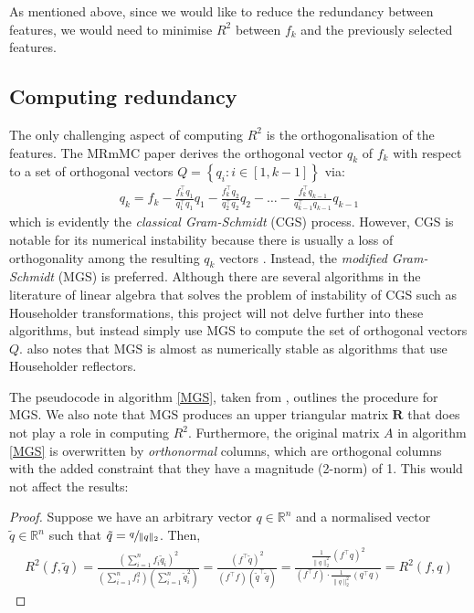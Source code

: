 \documentclass[12pt, twoside, a4paper]{report}
\begin{document}
As mentioned above, since we would like to reduce the redundancy between features, we would need to minimise $R^2$ between $f_k$ and the previously selected features.


\subsection{Computing redundancy}

The only challenging aspect of computing $R^2$ is the orthogonalisation of the features. The MRmMC paper \cite{RefWorks:187} derives the orthogonal vector $q_k$ of $f_k$ with respect to a set of orthogonal vectors $Q = \left\lbrace q_i: i \in [1, k-1] \right\rbrace$ via:
\begin{align*}
q_k = f_k  - \frac{f_k^\top q_1}{q_1^\top q_1}q_1  - \frac{f_k^\top q_2}{q_2^\top q_2}q_2 - \dots - \frac{f_k^\top q_{k-1}}{q_{k-1}^\top q_{k-1}}q_{k-1}
\end{align*}
which is evidently the \textit{classical Gram-Schmidt} (CGS) process. However, CGS is notable for its numerical instability because there is usually a loss of orthogonality among the resulting $q_k$ vectors \cite{RefWorks:195}. Instead, the \textit{modified Gram-Schmidt} (MGS) is preferred. Although there are several algorithms in the literature of linear algebra that solves the problem of instability of CGS such as Householder transformations, this project will not delve further into these algorithms, but instead simply use MGS to compute the set of orthogonal vectors $Q$. \cite{RefWorks:194} also notes that MGS is almost as numerically stable as algorithms that use Householder reflectors.

The pseudocode in algorithm \ref{MGS}, taken from \cite{RefWorks:195}, outlines the procedure for MGS. We also note that MGS produces an upper triangular matrix $\boldsymbol R$ that does not play a role in computing $R^2$. Furthermore, the original matrix $A$ in algorithm \ref{MGS} is overwritten by \textit{orthonormal} columns, which are orthogonal columns with the added constraint that they have a magnitude (2-norm) of 1. This would not affect the results:

\begin{proof}
Suppose we have an arbitrary vector $q \in \mathbb{R}^n$ and a normalised vector $\tilde{q} \in \mathbb{R}^n$ such that $\tilde{q} = \sfrac{q}{\| q \|_2}$. Then,
\begin{align*}
R^2(f, \tilde{q}) = \frac{\left( \sum_{i=1}^n f_i \tilde{q}_i \right)^2}{\left(\sum_{i=1}^n f_i^2 \right) \left( \sum_{i=1}^n \tilde{q}_i^2 \right)}
= \frac{\left( f^\top \tilde{q} \right)^2}{(f^\top f)(\tilde{q}^\top \tilde{q})}
= \frac{\frac{1}{\| q \|^2_2} \left( f^\top q \right)^2}{(f^\top f) \cdot \frac{1}{\| q \|^2_2} \left( q^\top q \right)} = R^2(f, q)
\end{align*}
\end{proof}
\end{document}
